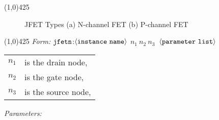 \documentclass{article}
\begin{document}
\hrulefill\linethickness{0.5mm}\line(1,0){425}
\normalsize
\newline
\begin{figure}[h]
\centerline{\epsfxsize=4in} \caption{JFET Types (a)
N-channel FET (b) P-channel FET}
\end{figure}
\newline
\linethickness{0.5mm} \line(1,0){425}
\newline
\textit{Form:}%
$\tt jfetn$:$\langle \tt{instance\ name}\rangle$ $n_1\ n_2\ n_3\ $
$\langle \tt{parameter\ list}\rangle$
\newline
\begin{tabular}{r l}
$n_1$ & is the drain node, \\
$n_2$ & is the gate node, \\
$n_3$ & is the source node, \\
\end{tabular}
\newline
\textit{Parameters:}%
\end{document}
